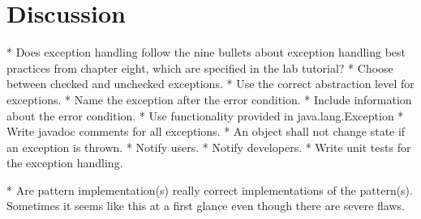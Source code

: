 \documentclass[a4paper]{scrreprt}
\newenvironment{longlisting}{\captionsetup{type=listing}}{}
\begin{document}
%
%
%
%

\chapter{Discussion}
\label{sec:discussion}
* Does exception handling follow the nine bullets about exception handling best
practices from chapter eight, which are specified in the lab tutorial?
    * Choose between checked and unchecked exceptions.
    * Use the correct abstraction level for exceptions.
    * Name the exception after the error condition.
    * Include information about the error condition.
    * Use functionality provided in java.lang.Exception
    * Write javadoc comments for all exceptions.
    * An object shall not change state if an exception is thrown.
    * Notify users.
    * Notify developers.
    * Write unit tests for the exception handling.


* Are pattern implementation(s) really correct implementations of the pattern(s).
Sometimes it seems like this at a first glance even though there are severe flaws.
\end{document}
